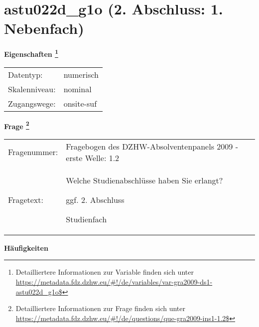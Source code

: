 
    \setcounter{footnote}{0}

    \vspace*{-1.8cm}
	\section{astu022d\_g1o (2. Abschluss: 1. Nebenfach)}
	\label{section:astu022d_g1o}



    \vspace*{0.5cm}
    \noindent\textbf{Eigenschaften
	\footnote{Detailliertere Informationen zur Variable finden sich unter
		\url{https://metadata.fdz.dzhw.eu/\#!/de/variables/var-gra2009-ds1-astu022d_g1o$}}}\\
	\begin{tabularx}{\hsize}{@{}lX}
	Datentyp: & numerisch \\
	Skalenniveau: & nominal \\
	Zugangswege: &
	  onsite-suf
 \\
    \end{tabularx}



				\vspace*{0.5cm}
                \noindent\textbf{Frage
	                \footnote{Detailliertere Informationen zur Frage finden sich unter
		              \url{https://metadata.fdz.dzhw.eu/\#!/de/questions/que-gra2009-ins1-1.2$}}}\\
				\begin{tabularx}{\hsize}{@{}lX}
					Fragenummer: &
					  Fragebogen des DZHW-Absolventenpanels 2009 - erste Welle:
					  1.2
 \\
					Fragetext: & Welche Studienabschlüsse haben Sie erlangt?\par  ggf. 2. Abschluss\par  Studienfach \\
				\end{tabularx}





        		\vspace*{0.5cm}
                \noindent\textbf{Häufigkeiten}

